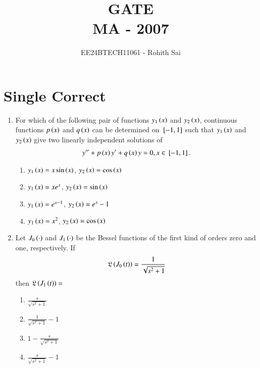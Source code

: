 \documentclass[journal]{IEEEtran}
\begin{document}

\vspace{3cm}

\title{GATE\\MA - 2007}
\author{EE24BTECH11061 - Rohith Sai}
\maketitle

\renewcommand{\thefigure}{\theenumi}
\renewcommand{\thetable}{\theenumi}

\section*{Single Correct}
\begin{enumerate}
\item For which of the following pair of functions $y_1\left(x\right)$ and $y_2\left(x\right)$, continuous functions $p\left(x\right)$ and $q\left(x\right)$ can be determined on ${}\left[-1,1\right]$ such that $y_1\left(x\right)$ and $y_2\left(x\right)$ give two linearly independent solutions of 
\begin{align*}
    y^{{\prime}{\prime}} +  p\left(x\right) y^{\prime} + q\left(x\right) y = 0, x \in {}\left[-1,1\right].
\end{align*}
\begin{multicols}{2}
    \begin{enumerate}
        \item $y_1\left(x\right) = x \sin{\ensuremath{\left(x\right)}}$, $y_2\left(x\right) = \cos{\ensuremath{\left(x\right)}}$
        \item $y_1\left(x\right) = x e^{x}$, $y_2\left(x\right) = \sin{\ensuremath{\left(x\right)}}$
        \item $y_1\left(x\right) = e^{x-1}$, $y_2\left(x\right) = e^{x}-1$
        \item $y_1\left(x\right) = x^2$, $y_2\left(x\right) = \cos{\ensuremath{\left(x\right)}}$
    \end{enumerate}
\end{multicols}

\item Let $J_0\left(\cdot\right)$ and $J_1\left(\cdot\right)$ be the Bessel functions of the first kind of orders zero and one, respectively. If
\begin{align*}
    \mathfrak{L}\left(J_0\left(t\right)\right) = \frac{1}{\sqrt{s^2+1}}
\end{align*}
then $\mathfrak{L}\left(J_1\left(t\right)\right) = $
\begin{multicols}{2}
    \begin{enumerate}
        \item $\frac{s}{\sqrt{s^2+1}}$
        \item $\frac{1}{\sqrt{s^2+1}} - 1$
        \item $1- \frac{s}{\sqrt{s^2+1}}$
        \item $\frac{s}{\sqrt{s^2+1}} - 1$
    \end{enumerate}
\end{multicols}


\end{enumerate}
\end{document}
